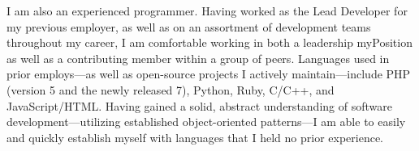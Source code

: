 \begin{letterEnv}
    I am also an experienced programmer. Having worked as the Lead Developer for my previous employer, as well as on an
    assortment of development teams throughout my career, I am comfortable working in both a leadership myPosition as well as
    a contributing member within a group of peers. Languages used in prior employs---as well as open-source projects
    I actively maintain---include PHP (version 5 and the newly released 7), Python, Ruby, C/C++, and JavaScript/HTML. Having
    gained a solid, abstract understanding of software development---utilizing established object-oriented patterns---I am
    able to easily and quickly establish myself with languages that I held no prior experience.

\end{letterEnv}


